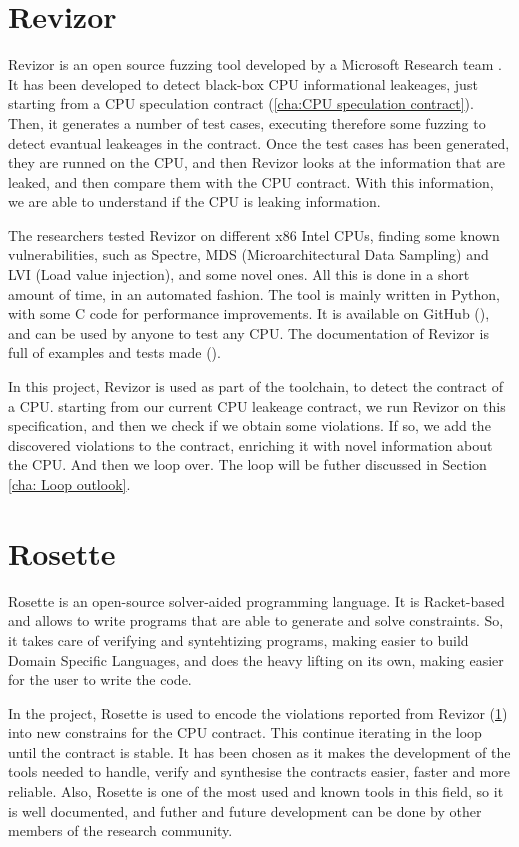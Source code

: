 \section{Revizor}
\label{cha:Revizor} Revizor is an open source fuzzing tool developed by a Microsoft
Research team \cite{article}. It has been developed to detect black-box CPU
informational leakeages, just starting from a CPU speculation contract (\ref*{cha:CPU
speculation contract}). Then, it generates a number of test cases, executing
therefore some fuzzing to detect evantual leakeages in the contract. Once the test
cases has been generated, they are runned on the CPU, and then Revizor looks at the
information that are leaked, and then compare them with the CPU contract. With this
information, we are able to understand if the CPU is leaking information.

The researchers tested Revizor on different x86 Intel CPUs, finding some known vulnerabilities,
such as Spectre, MDS (Microarchitectural Data Sampling) and LVI (Load value
injection), and some novel ones. All this is done in a short amount of time, in
an automated fashion. The tool is mainly written in Python, with some C code for
performance improvements. It is available on GitHub (\cite{repo}), and can be
used by anyone to test any CPU. The documentation of Revizor is full of examples
and tests made (\cite{misc}).

In this project, Revizor is used as part of the toolchain, to detect the contract
of a CPU. starting from our current CPU leakeage contract, we run Revizor on this
specification, and then we check if we obtain some violations. If so, we add the
discovered violations to the contract, enriching it with novel information about
the CPU. And then we loop over. The loop will be futher discussed in Section \ref*{cha:
Loop outlook}.

\section{Rosette}
\label{cha:Rosette} Rosette is an open-source solver-aided programming language.
It is Racket-based and allows to write programs that are able to generate and
solve constraints. So, it takes care of verifying and syntehtizing programs, making
easier to build Domain Specific Languages, and does the heavy lifting on its own,
making easier for the user to write the code.

In the project, Rosette is used to encode the violations reported from Revizor (\ref*{cha:Revizor})
into new constrains for the CPU contract. This continue iterating in the loop until
the contract is stable. It has been chosen as it makes the development of the
tools needed to handle, verify and synthesise the contracts easier, faster and
more reliable. Also, Rosette is one of the most used and known tools in this
field, so it is well documented, and futher and future development can be done
by other members of the research community.

